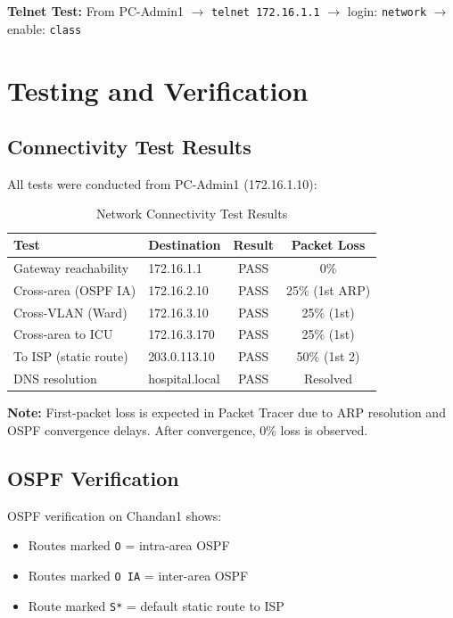\documentclass[12pt,a4paper]{report}
\begin{document}
\textbf{Telnet Test:} From PC-Admin1 $\rightarrow$ \texttt{telnet 172.16.1.1} $\rightarrow$ login: \texttt{network} $\rightarrow$ enable: \texttt{class}

\chapter{Testing and Verification}

\section{Connectivity Test Results}
All tests were conducted from PC-Admin1 (172.16.1.10):

\begin{table}[H]
\centering
\caption{Network Connectivity Test Results}
\begin{tabular}{llcc}
\toprule
\textbf{Test} & \textbf{Destination} & \textbf{Result} & \textbf{Packet Loss} \\
\midrule
Gateway reachability & 172.16.1.1 & PASS & 0\% \\
Cross-area (OSPF IA) & 172.16.2.10 & PASS & 25\% (1st ARP) \\
Cross-VLAN (Ward) & 172.16.3.10 & PASS & 25\% (1st) \\
Cross-area to ICU & 172.16.3.170 & PASS & 25\% (1st) \\
To ISP (static route) & 203.0.113.10 & PASS & 50\% (1st 2) \\
DNS resolution & hospital.local & PASS & Resolved \\
\bottomrule
\end{tabular}
\end{table}

\textbf{Note:} First-packet loss is expected in Packet Tracer due to ARP resolution and OSPF convergence delays. After convergence, 0\% loss is observed.

\section{OSPF Verification}
OSPF verification on Chandan1 shows:
\begin{itemize}[noitemsep]
    \item Routes marked \texttt{O} = intra-area OSPF
    \item Routes marked \texttt{O IA} = inter-area OSPF
    \item Route marked \texttt{S*} = default static route to ISP
\end{itemize}
\end{document}
